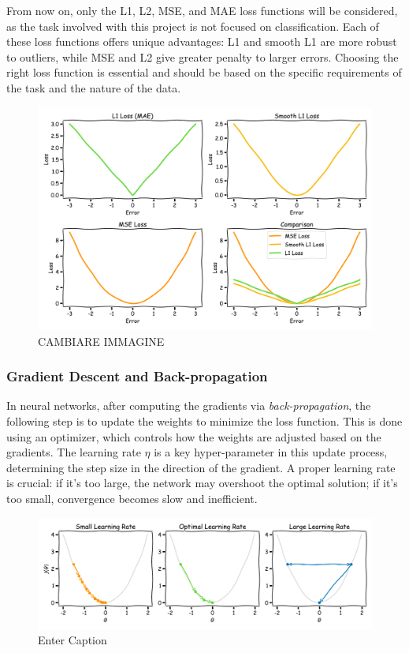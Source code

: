 From now on, only the L1, L2, MSE, and MAE loss functions will be considered, as the task involved with this project is not focused on classification. Each of these loss functions offers unique advantages: L1 and smooth L1 are more robust to outliers, while MSE and L2 give greater penalty to larger errors. Choosing the right loss function is essential and should be based on the specific requirements of the task and the nature of the data.
\begin{figure}[H]
    \centering
    \includegraphics[width=1\linewidth]{LateX/figs/loss_functions_xkcd.pdf}
    \caption{CAMBIARE IMMAGINE}
    \label{fig:enter-label}
\end{figure}

\subsubsection*{Gradient Descent and Back-propagation}
In neural networks, after computing the gradients via \textit{back-propagation}, the following step is to update the weights to minimize the loss function. This is done using an optimizer, which controls how the weights are adjusted based on the gradients. The learning rate $\eta$ is a key hyper-parameter in this update process, determining the step size in the direction of the gradient. 
A proper learning rate is crucial: if it's too large, the network may overshoot the optimal solution; if it's too small, convergence becomes slow and inefficient.
\begin{figure}[H]
    \centering
    \includegraphics[width=1\linewidth]{LateX//figs/learning_rate.pdf}
    \caption{Enter Caption}
    \label{fig:enter-label}
\end{figure}

